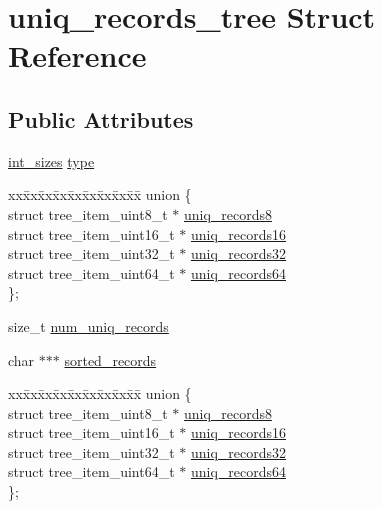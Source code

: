 \hypertarget{structuniq__records__tree}{\section{uniq\-\_\-records\-\_\-tree \-Struct \-Reference}
\label{structuniq__records__tree}
}
\subsection*{\-Public \-Attributes}
\begin{DoxyCompactItemize}
\item 
\hyperlink{grouper__fptr_8c_a510e286db24999375ef3f3ed62367ed0}{int\-\_\-sizes} \hyperlink{structuniq__records__tree_a2bd28ef4c61dd21453af3c5b1bcfae99}{type}
\item 
\begin{tabbing}
xx\=xx\=xx\=xx\=xx\=xx\=xx\=xx\=xx\=\kill
union \{\\
\>struct tree\_item\_uint8\_t $\ast$ \hyperlink{structuniq__records__tree_a62c665f69f3c41cf61d0fb3164bf6bb8}{uniq\_records8}\\
\>struct tree\_item\_uint16\_t $\ast$ \hyperlink{structuniq__records__tree_a9df29b0df41a45e032b92224b454f52e}{uniq\_records16}\\
\>struct tree\_item\_uint32\_t $\ast$ \hyperlink{structuniq__records__tree_a5804158857fe19cae48836378cc109f7}{uniq\_records32}\\
\>struct tree\_item\_uint64\_t $\ast$ \hyperlink{structuniq__records__tree_a6fda0a82a4841a0d9df656535dd0a431}{uniq\_records64}\\
\}; \\

\end{tabbing}\item 
size\-\_\-t \hyperlink{structuniq__records__tree_ad29c48d8c32333c64850922e14f07653}{num\-\_\-uniq\-\_\-records}
\item 
char $\ast$$\ast$$\ast$ \hyperlink{structuniq__records__tree_afdb2f7430805f876c7c10f9c1d76266d}{sorted\-\_\-records}
\item 
\begin{tabbing}
xx\=xx\=xx\=xx\=xx\=xx\=xx\=xx\=xx\=\kill
union \{\\
\>struct tree\_item\_uint8\_t $\ast$ \hyperlink{structuniq__records__tree_a62c665f69f3c41cf61d0fb3164bf6bb8}{uniq\_records8}\\
\>struct tree\_item\_uint16\_t $\ast$ \hyperlink{structuniq__records__tree_a9df29b0df41a45e032b92224b454f52e}{uniq\_records16}\\
\>struct tree\_item\_uint32\_t $\ast$ \hyperlink{structuniq__records__tree_a5804158857fe19cae48836378cc109f7}{uniq\_records32}\\
\>struct tree\_item\_uint64\_t $\ast$ \hyperlink{structuniq__records__tree_a6fda0a82a4841a0d9df656535dd0a431}{uniq\_records64}\\
\}; \\

\end{tabbing}\end{DoxyCompactItemize}


